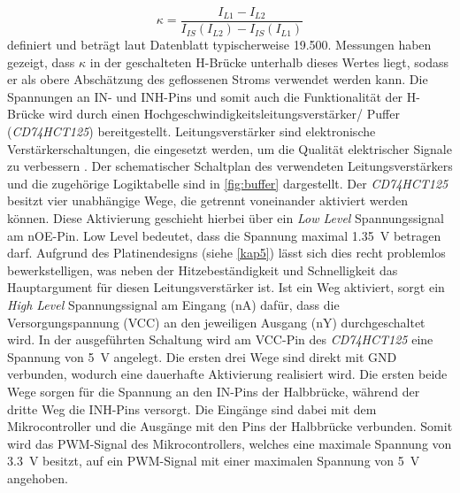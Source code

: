 \begin{equation}
\kappa = \frac{I_{L1}-I_{L2}}{I_{IS}(I_{L2})-I_{IS}(I_{L1})}
\end{equation}\noindent
definiert und beträgt laut Datenblatt typischerweise 19.500. Messungen haben gezeigt, dass $\kappa$ in der geschalteten H-Brücke unterhalb dieses Wertes liegt, sodass er als obere Abschätzung des geflossenen Stroms verwendet werden kann.
Die Spannungen an IN- und INH-Pins und somit auch die Funktionalität der H-Brücke wird durch einen Hochgeschwindigkeitsleitungsverstärker/ Puffer (\textit{CD74HCT125}) bereitgestellt. Leitungsverstärker sind elektronische Verstärkerschaltungen, die eingesetzt werden, um die Qualität elektrischer Signale zu verbessern \cite{Conrads2014}. Der schematischer Schaltplan des verwendeten Leitungsverstärkers und die zugehörige Logiktabelle sind in \autoref{fig:buffer} dargestellt. Der \textit{CD74HCT125} besitzt vier unabhängige Wege, die getrennt voneinander aktiviert werden können. Diese Aktivierung geschieht hierbei über ein \textit{Low Level} Spannungssignal am nOE-Pin. Low Level bedeutet, dass die Spannung maximal \SI{1,35}{V} betragen darf. Aufgrund des Platinendesigns (siehe \autoref{kap5}) lässt sich dies recht problemlos bewerkstelligen, was neben der Hitzebeständigkeit und Schnelligkeit das Hauptargument für diesen Leitungsverstärker ist. Ist ein Weg aktiviert, sorgt ein \textit{High Level} Spannungssignal am Eingang (nA) dafür, dass die Versorgungspannung (VCC) an den jeweiligen Ausgang (nY) durchgeschaltet wird. In der ausgeführten Schaltung wird am VCC-Pin des \textit{CD74HCT125} eine Spannung von \SI{5}{V} angelegt. Die ersten drei Wege sind direkt mit GND verbunden, wodurch eine dauerhafte Aktivierung realisiert wird. Die ersten beide Wege sorgen für die Spannung an den IN-Pins der Halbbrücke, während der dritte Weg die INH-Pins versorgt. Die Eingänge sind dabei mit dem Mikrocontroller und die Ausgänge mit den Pins der Halbbrücke verbunden. Somit wird das PWM-Signal des Mikrocontrollers, welches eine maximale Spannung von \SI{3,3}{V} besitzt, auf ein PWM-Signal mit einer maximalen Spannung von \SI{5}{V} angehoben.

